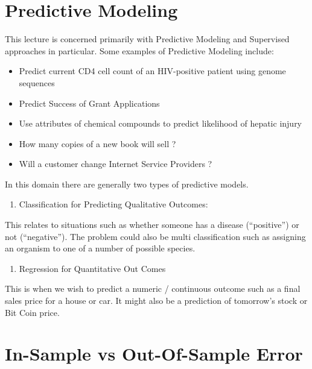 \documentclass[
]{book}
\providecommand{\tightlist}{%
  \setlength{\itemsep}{0pt}\setlength{\parskip}{0pt}}
\begin{document}
\hypertarget{predictive-modeling}{%
\section{Predictive Modeling}\label{predictive-modeling}}

This lecture is concerned primarily with Predictive Modeling and Supervised approaches in particular. Some examples of Predictive Modeling include:

\begin{itemize}
\item
  Predict current CD4 cell count of an HIV-positive patient using genome sequences
\item
  Predict Success of Grant Applications
\item
  Use attributes of chemical compounds to predict likelihood of hepatic injury
\item
  How many copies of a new book will sell ?
\item
  Will a customer change Internet Service Providers ?
\end{itemize}

In this domain there are generally two types of predictive models.

\begin{enumerate}
\def\labelenumi{\arabic{enumi})}
\tightlist
\item
  Classification for Predicting Qualitative Outcomes:
\end{enumerate}

This relates to situations such as whether someone has a disease (``positive'') or not (``negative''). The problem could also be multi classification such as assigning an organism to one of a number of possible species.

\begin{enumerate}
\def\labelenumi{\arabic{enumi})}
\setcounter{enumi}{1}
\tightlist
\item
  Regression for Quantitative Out Comes
\end{enumerate}

This is when we wish to predict a numeric / continuous outcome such as a final sales price for a house or car. It might also be a prediction of tomorrow's stock or Bit Coin price.

\hypertarget{in-sample-vs-out-of-sample-error}{%
\section{In-Sample vs Out-Of-Sample Error}\label{in-sample-vs-out-of-sample-error}}
\end{document}
